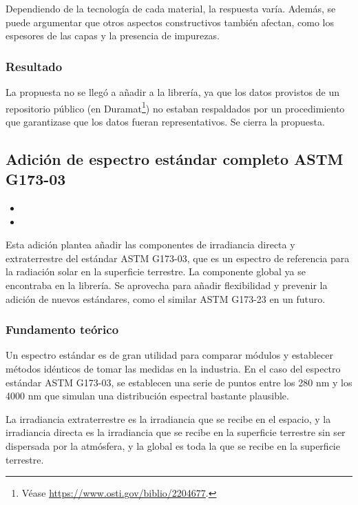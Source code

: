 Dependiendo de la tecnología de cada material, la respuesta varía. Además, se puede argumentar que otros aspectos constructivos también afectan, como los espesores de las capas y la presencia de impurezas.

\subsubsection{Resultado}

La propuesta no se llegó a añadir a la librería, ya que los datos provistos de un repositorio público (en Duramat\footnote{Véase \url{https://www.osti.gov/biblio/2204677}.}) no estaban respaldados por un procedimiento que garantizase que los datos fueran representativos. Se cierra la propuesta.

\subsection{Adición de espectro estándar completo ASTM G173-03}

\begin{itemize}
    \item {}
    \item {}
\end{itemize}

Esta adición plantea añadir las componentes de irradiancia directa y extraterrestre del estándar ASTM G173-03, que es un espectro de referencia para la radiación solar en la superficie terrestre. La componente global ya se encontraba en la librería. Se aprovecha para añadir flexibilidad y prevenir la adición de nuevos estándares, como el similar ASTM G173-23 en un futuro.

\subsubsection{Fundamento teórico}

Un espectro estándar es de gran utilidad para comparar módulos y establecer métodos idénticos de tomar las medidas en la industria. En el caso del espectro estándar ASTM G173-03, se establecen una serie de puntos entre los 280 nm y los 4000 nm que simulan una distribución espectral bastante plausible.

La irradiancia extraterrestre es la irradiancia que se recibe en el espacio, y la irradiancia directa es la irradiancia que se recibe en la superficie terrestre sin ser dispersada por la atmósfera, y la global es toda la que se recibe en la superficie terrestre.

